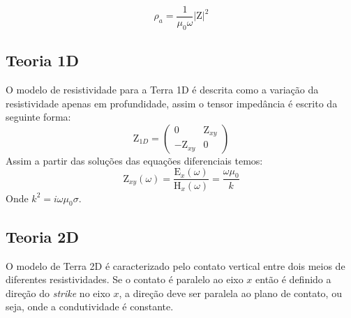 	    \begin{equation}
	    \label{rho_a_Z}
	     \rho_a = \frac{1}{\mu_0 \omega } 	\left | \textrm{Z} \right |^2
	    \end{equation}

	   
	   \subsection{Teoria 1D}
	    
	    O modelo de resistividade para a Terra 1D é descrita como a variação da resistividade apenas em profundidade, assim 
	    o tensor impedância é escrito da seguinte forma: 
	    \begin{equation}
	     \textrm{Z}_{1D} = \left (\begin{array}{cc}
	                              0 & \textrm{Z}_{xy}\\
	                              -\textrm{Z}_{xy} & 0
	                              \end{array} \right)
	    \end{equation}
	    Assim a partir das soluções das equações diferenciais temos:
	    \begin{equation}
	     \textrm{Z}_{xy}(\omega) = \frac{\textrm{E}_x(\omega)}{\textrm{H}_x(\omega)} = \frac{\omega \mu_0}{k}
	    \end{equation}
	    Onde $k^2 = i \omega \mu_0 \sigma$. 
	    
	    
	    \subsection{Teoria 2D}
	    O modelo de Terra 2D é caracterizado pelo contato vertical entre dois meios de diferentes resistividades. Se o contato é
	    paralelo ao eixo $x$ então é definido a direção do \textit{strike} no eixo $x$, a direção deve ser paralela ao plano de contato,
	    ou seja, onde a condutividade é constante.%
	    

